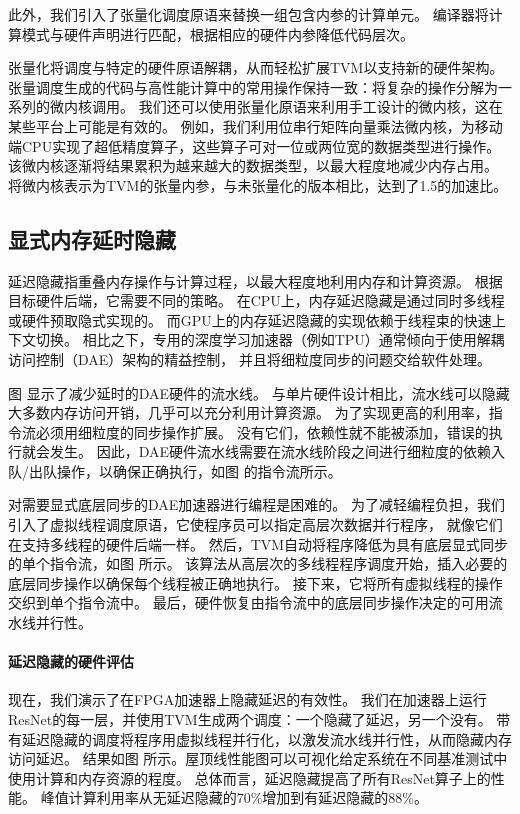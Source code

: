 此外，我们引入了张量化调度原语来替换一组包含内参的计算单元。
编译器将计算模式与硬件声明进行匹配，根据相应的硬件内参降低代码层次。

张量化将调度与特定的硬件原语解耦，从而轻松扩展TVM以支持新的硬件架构。
张量调度生成的代码与高性能计算中的常用操作保持一致：将复杂的操作分解为一系列的微内核调用。
我们还可以使用张量化原语来利用手工设计的微内核，这在某些平台上可能是有效的。
例如，我们利用位串行矩阵向量乘法微内核，为移动端CPU实现了超低精度算子，这些算子可对一位或两位宽的数据类型进行操作。
该微内核逐渐将结果累积为越来越大的数据类型，以最大程度地减少内存占用。
将微内核表示为TVM的张量内参，与未张量化的版本相比，达到了1.5的加速比。

\subsection{显式内存延时隐藏}
延迟隐藏指重叠内存操作与计算过程，以最大程度地利用内存和计算资源。
根据目标硬件后端，它需要不同的策略。
在CPU上，内存延迟隐藏是通过同时多线程或硬件预取隐式实现的。
而GPU上的内存延迟隐藏的实现依赖于线程束的快速上下文切换。
相比之下，专用的深度学习加速器（例如TPU）通常倾向于使用解耦访问控制（DAE）架构的精益控制，
并且将细粒度同步的问题交给软件处理。

图 显示了减少延时的DAE硬件的流水线。
与单片硬件设计相比，流水线可以隐藏大多数内存访问开销，几乎可以充分利用计算资源。
为了实现更高的利用率，指令流必须用细粒度的同步操作扩展。
没有它们，依赖性就不能被添加，错误的执行就会发生。
因此，DAE硬件流水线需要在流水线阶段之间进行细粒度的依赖入队/出队操作，以确保正确执行，如图 的指令流所示。

对需要显式底层同步的DAE加速器进行编程是困难的。
为了减轻编程负担，我们引入了虚拟线程调度原语，它使程序员可以指定高层次数据并行程序，
就像它们在支持多线程的硬件后端一样。
然后，TVM自动将程序降低为具有底层显式同步的单个指令流，如图 所示。
该算法从高层次的多线程程序调度开始，插入必要的底层同步操作以确保每个线程被正确地执行。
接下来，它将所有虚拟线程的操作交织到单个指令流中。
最后，硬件恢复由指令流中的底层同步操作决定的可用流水线并行性。

\paragraph{延迟隐藏的硬件评估}
现在，我们演示了在FPGA加速器上隐藏延迟的有效性。
我们在加速器上运行ResNet的每一层，并使用TVM生成两个调度：一个隐藏了延迟，另一个没有。
带有延迟隐藏的调度将程序用虚拟线程并行化，以激发流水线并行性，从而隐藏内存访问延迟。
结果如图 所示。屋顶线性能图可以可视化给定系统在不同基准测试中使用计算和内存资源的程度。
总体而言，延迟隐藏提高了所有ResNet算子上的性能。
峰值计算利用率从无延迟隐藏的70\%增加到有延迟隐藏的88\%。
